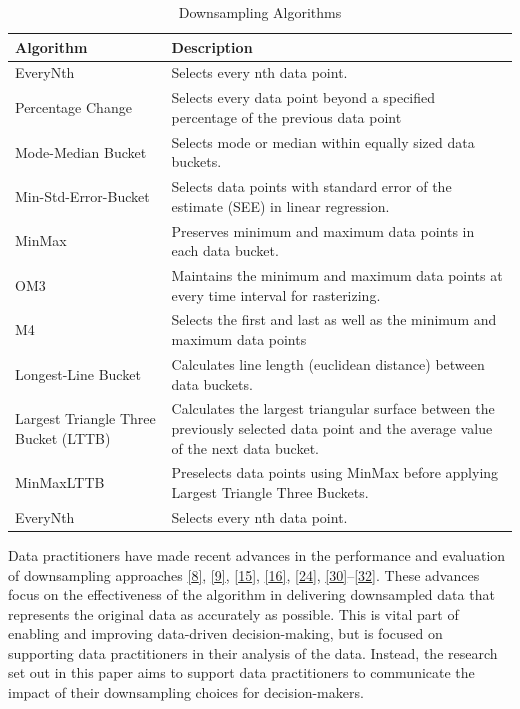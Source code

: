 \documentclass{article}
\begin{document}
\begin{table}[H]

\caption{\label{tab:unnamed-chunk-1}Downsampling Algorithms}
\centering
\begin{tabular}[t]{l|l}
\hline
Algorithm & Description\\
\hline
EveryNth & Selects every nth data point.\\
\hline
Percentage Change & Selects every data point beyond a specified percentage of the previous data point\\
\hline
Mode-Median Bucket & Selects mode or median within equally sized data buckets.\\
\hline
Min-Std-Error-Bucket & Selects data points with standard error of the estimate (SEE) in linear regression.\\
\hline
MinMax & Preserves minimum and maximum data points in each data bucket.\\
\hline
OM3 & Maintains the minimum and maximum data points at every time interval for rasterizing.\\
\hline
M4 & Selects the first and last as well as the minimum and maximum data points\\
\hline
Longest-Line Bucket & Calculates line length (euclidean distance) between data buckets.\\
\hline
Largest Triangle Three Bucket (LTTB) & Calculates the largest triangular surface between the previously selected data point and the average value of the next data bucket.\\
\hline
MinMaxLTTB & Preselects data points using MinMax before applying Largest Triangle Three Buckets.\\
\hline
EveryNth & Selects every nth data point.\\
\hline
\end{tabular}
\end{table}

Data practitioners have made recent advances in the performance and
evaluation of downsampling approaches
\protect\hyperlink{ref-datapoint}{{[}8{]}},
\protect\hyperlink{ref-MinMaxLTTB}{{[}9{]}},
\protect\hyperlink{ref-downsampling}{{[}15{]}},
\protect\hyperlink{ref-sampling}{{[}16{]}},
\protect\hyperlink{ref-plotly}{{[}24{]}},
\protect\hyperlink{ref-dashql}{{[}30{]}}--\protect\hyperlink{ref-MinMaxOrdered}{{[}32{]}}.
These advances focus on the effectiveness of the algorithm in delivering
downsampled data that represents the original data as accurately as
possible. This is vital part of enabling and improving data-driven
decision-making, but is focused on supporting data practitioners in
their analysis of the data. Instead, the research set out in this paper
aims to support data practitioners to communicate the impact of their
downsampling choices for decision-makers.
\end{document}

